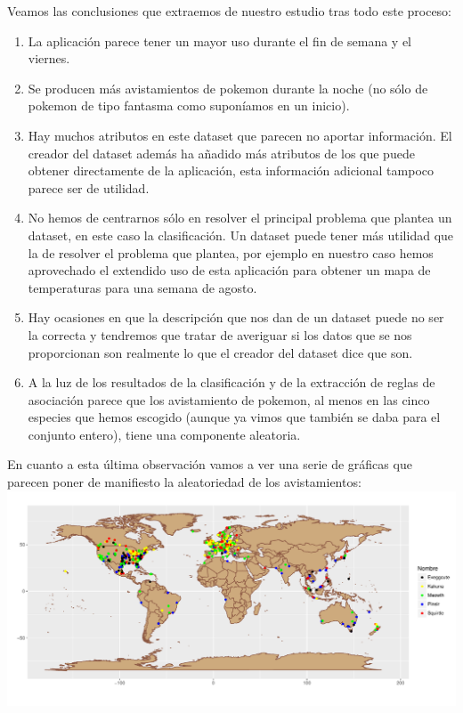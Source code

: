 Veamos las conclusiones que extraemos de nuestro estudio tras todo este proceso:

\begin{enumerate}
\item La aplicación parece tener un mayor uso durante el fin de semana y el viernes.
\item Se producen más avistamientos de pokemon durante la noche (no sólo de pokemon de tipo fantasma como suponíamos en un inicio).
\item Hay muchos atributos en este dataset que parecen no aportar información. El creador del dataset además ha añadido más atributos de los que puede obtener directamente de la aplicación, esta información adicional tampoco parece ser de utilidad.
\item No hemos de centrarnos sólo en resolver el principal problema que plantea un dataset, en este caso la clasificación. Un dataset puede tener más utilidad que la de resolver el problema que plantea, por ejemplo en nuestro caso hemos aprovechado el extendido uso de esta aplicación para obtener un mapa de temperaturas para una semana de agosto.
\item Hay ocasiones en que la descripción que nos dan de un dataset puede no ser la correcta y tendremos que tratar de averiguar si los datos que se nos proporcionan son realmente lo que el creador del dataset dice que son.
\item A la luz de los resultados de la clasificación y de la extracción de reglas de asociación parece que los avistamiento de pokemon, al menos en las cinco especies que hemos escogido (aunque ya vimos que también se daba para el conjunto entero), tiene una componente aleatoria.
\end{enumerate}

En cuanto a esta última observación vamos a ver una serie de gráficas que parecen poner de manifiesto la aleatoriedad de los avistamientos:\\

\includegraphics[width = \textwidth]{img/mapaFiltrado.pdf}

